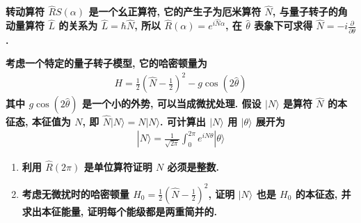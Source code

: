 \documentclass[../../main.tex]{subfiles}
\begin{document}
\begin{enumerate}
  \textbf{转动算符 $\hat{R}S(\alpha)$ 是一个幺正算符, 它的产生子为厄米算符 $\hat{N}$, 与量子转子的角动量算符 $\hat{L}$ 的关系为 $\hat{L} = \hbar\hat{N}$, 所以 $\hat{R}(\alpha) = e^{i\hat{N}\alpha}$, 在 $\hat{\theta}$ 表象下可求得 $\hat{N} = -i\frac{\partial}{\partial\theta}$. }

  \textbf{考虑一个特定的量子转子模型, 它的哈密顿量为
  \begin{align*}
    H = \frac{1}{2}\left(\hat{N} - \frac{1}{2}\right)^{2} - g\cos{\left(2\hat{\theta}\right)}
  \end{align*}
  其中 $g\cos{\left(2\hat{\theta}\right)}$ 是一个小的外势, 可以当成微扰处理. 假设 $|N\rangle$ 是算符 $\hat{N}$ 的本征态, 本征值为 $N$, 即 $\hat{N}|N\rangle = N|N\rangle$. 可计算出 $|N\rangle$ 用 $|\theta\rangle$ 展开为
  \begin{align*}
    |N\rangle = \frac{1}{\sqrt{2\pi}}\int_{0}^{2\pi}e^{iN\theta}|\theta\rangle
  \end{align*}}
  \begin{enumerate}
    \item \textbf{利用 $\hat{R}(2\pi)$ 是单位算符证明 $N$ 必须是整数.}
    
    {}
    
    \item \textbf{考虑无微扰时的哈密顿量 $H_{0} = \frac{1}{2}\left(\hat{N} - \frac{1}{2}\right)^{2}$, 证明 $|N\rangle$ 也是 $H_{0}$ 的本征态, 并求出本征能量, 证明每个能级都是两重简并的. }
    
    {}
    

\end{enumerate}
\end{enumerate}
\end{document}
